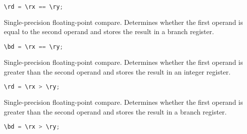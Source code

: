 \begin{lstlisting}[numbers=none, basicstyle=\ttfamily\footnotesize, language=C++]
\rd = \rx == \ry;
\end{lstlisting}

Single-precision floating-point compare. Determines whether the first operand is equal to the second operand and stores
the result in a branch register.

\begin{lstlisting}[numbers=none, basicstyle=\ttfamily\footnotesize, language=C++]
\bd = \rx == \ry;
\end{lstlisting}

Single-precision floating-point compare. Determines whether the first operand is greater than the second operand and stores
the result in an integer register.

\begin{lstlisting}[numbers=none, basicstyle=\ttfamily\footnotesize, language=C++]
\rd = \rx > \ry;
\end{lstlisting}

Single-precision floating-point compare. Determines whether the first operand is greater than the second operand and stores
the result in a branch register.

\begin{lstlisting}[numbers=none, basicstyle=\ttfamily\footnotesize, language=C++]
\bd = \rx > \ry;
\end{lstlisting}

%

